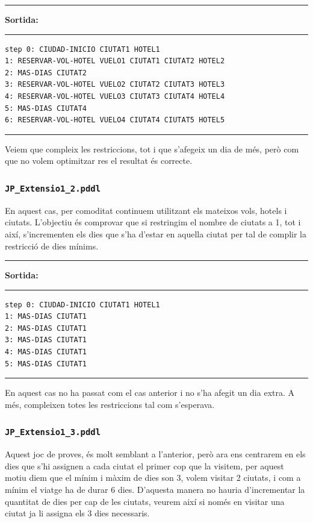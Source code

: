 \documentclass[11pt,a4paper]{article}
\begin{document}
\begin{samepage}
\medskip
\noindent
\rule{0.1\textwidth}{0.5mm}
\textbf{Sortida:}
\rule{0.76\textwidth}{0.5mm}
\begin{verbatim}
step 0: CIUDAD-INICIO CIUTAT1 HOTEL1
1: RESERVAR-VOL-HOTEL VUELO1 CIUTAT1 CIUTAT2 HOTEL2
2: MAS-DIAS CIUTAT2
3: RESERVAR-VOL-HOTEL VUELO2 CIUTAT2 CIUTAT3 HOTEL3
4: RESERVAR-VOL-HOTEL VUELO3 CIUTAT3 CIUTAT4 HOTEL4
5: MAS-DIAS CIUTAT4
6: RESERVAR-VOL-HOTEL VUELO4 CIUTAT4 CIUTAT5 HOTEL5
\end{verbatim}
\rule{\textwidth}{0.5mm}
\medskip
\end{samepage}

Veiem que compleix les restriccions, tot i que s'afegeix un dia de més, però com que no volem optimitzar res el resultat és correcte.

\subsubsection*{\texttt{JP\_Extensio1\_2.pddl}}

En aquest cas, per comoditat continuem utilitzant els mateixos vols, hotels i ciutats. L'objectiu és comprovar que si restringim el nombre de ciutats a 1, tot i així, s'incrementen els dies que s'ha d'estar en aquella ciutat per tal de complir la restricció de dies mínims.

\begin{samepage}
\medskip
\noindent
\rule{0.1\textwidth}{0.5mm}
\textbf{Sortida:}
\rule{0.76\textwidth}{0.5mm}
\begin{verbatim}
step 0: CIUDAD-INICIO CIUTAT1 HOTEL1
1: MAS-DIAS CIUTAT1
2: MAS-DIAS CIUTAT1
3: MAS-DIAS CIUTAT1
4: MAS-DIAS CIUTAT1
5: MAS-DIAS CIUTAT1
\end{verbatim}
\rule{\textwidth}{0.5mm}
\medskip
\end{samepage}

En aquest cas no ha passat com el cas anterior i no s'ha afegit un dia extra. A més, compleixen totes les restriccions tal com s'esperava.

\subsubsection*{\texttt{JP\_Extensio1\_3.pddl}}

Aquest joc de proves, és molt semblant a l'anterior, però ara ens centrarem en els dies que s'hi assignen a cada ciutat el primer cop que la visitem, per aquest motiu diem que el mínim i màxim de dies son 3, volem visitar 2 ciutats, i com a mínim el viatge ha de durar 6 dies. D'aquesta manera no hauria d'incrementar la quantitat de dies per cap de les ciutats, veurem així si només en visitar una ciutat ja li assigna els 3 dies necessaris.
\end{document}
